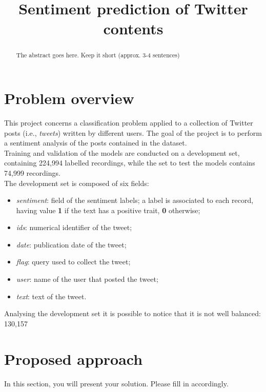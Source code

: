 \documentclass[conference]{IEEEtran}
\begin{document}
\title{Sentiment prediction of Twitter contents}

\author{
}

\maketitle

\begin{abstract}
The abstract goes here. Keep it short (approx. 3-4 sentences)
\end{abstract}

\section{Problem overview}
This project concerns a classification problem applied to a collection of Twitter posts (i.e., \textit{tweets}) written by different users. The goal of the project is to perform a sentiment analysis of the posts contained in the dataset.\\
Training and validation of the models are conducted on a development set, containing 224,994 labelled recordings, while the set to test the models contains 74,999 recordings.\\
The development set is composed of six fields:
\begin{itemize}
    \item \textit{sentiment}: field of the sentiment labels; a label is associated to each record, having value \textbf{1} if the text has a positive trait, \textbf{0} otherwise;
    \item \textit{ids}: numerical identifier of the tweet;
    \item \textit{date}: publication date of the tweet;
    \item \textit{flag}: query used to collect the tweet;
    \item \textit{user}: name of the user that posted the tweet;
    \item \textit{text}: text of the tweet. 
\end{itemize}
Analysing the development set it is possible to notice that it is not well balanced: 130,157 



\section{Proposed approach}
In this section, you will present your solution. Please fill in accordingly.
\end{document}
